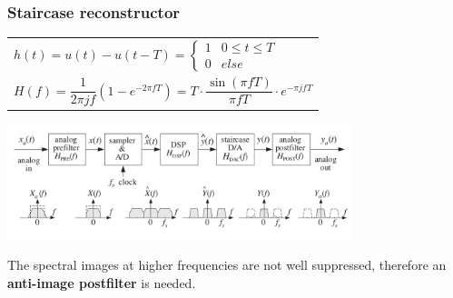 \subsubsection{Staircase reconstructor }
  \begin{tabular}{p{8cm}}
    $h(t) = u(t) - u(t-T) = \left\lbrace \begin{matrix}
      1 & 0\leq t \leq T \\
      0 & else
    \end{matrix}\right.$ \\
    $H(f) = \dfrac{1}{2\pi j f}(1-e^{-2\pi f T}) = T \cdot \dfrac{\sin(\pi f T)}{\pi f T}\cdot e^{-\pi j f T}$
  \end{tabular}
  \begin{minipage}{10cm}
	    \includegraphics[width=10cm]{./picture/compOfDSPSystem}
  \end{minipage}
  
  The spectral images at higher frequencies are not well suppressed, therefore an \textbf{anti-image postfilter} is needed.\\

  

  
  
